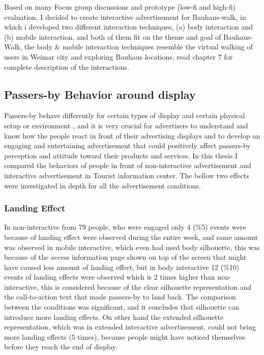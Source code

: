 Based on many Focus group discussions and prototype (low-fi and high-fi) evaluation, I decided to create interactive advertisement for Bauhaus-walk, in which i developed two different interaction techniques, (a) body interaction and (b) mobile interaction, and both of them fit on the theme and goal of Bauhaus-Walk, the body \& mobile interaction techniques resemble the virtual walking of users in Weimar city and exploring Bauhaus locations, read chapter 7 for complete description of the interactions.


\subsection{Passers-by Behavior around display}
Passers-by behave differently for certain types of display\cite{CylindricalScreen}   and certain physical setup or environment \cite{chained_displays, LookingGlass}, and it is very crucial for advertisers to understand and know how the people react in front of their advertising displays and to develop an engaging and entertaining advertisement that could positively affect passers-by perception and attitude toward their products and services. In this thesis I compared the behaviors of people in front of non-interactive advertisement and interactive advertisement in Tourist information center. The bellow two effects were investigated in depth for all the advertisement conditions.

\subsubsection{Landing Effect}
In non-interactive from 79 people, who were engaged only 4 (\%5) events were because of landing effect were observed during the entire week, and same amount was observed in mobile interactive, which even had used body silhouette, this was because of the access information page shown on top of the screen that might have caused less amount of landing effect, but in body interactive 12 (\%10) events of landing effects were observed which is 2 times higher than non-interactive, this is considered because of the clear silhouette representation and the call-to-action text that made passers-by to land back. The comparison between the conditions was significant, and it concludes that silhouette can introduce more landing effects. On other hand the extended silhouette representation, which was in extended interactive advertisement, could not bring more landing effects (5 times), because people might have noticed themselves before they reach the end of display.

